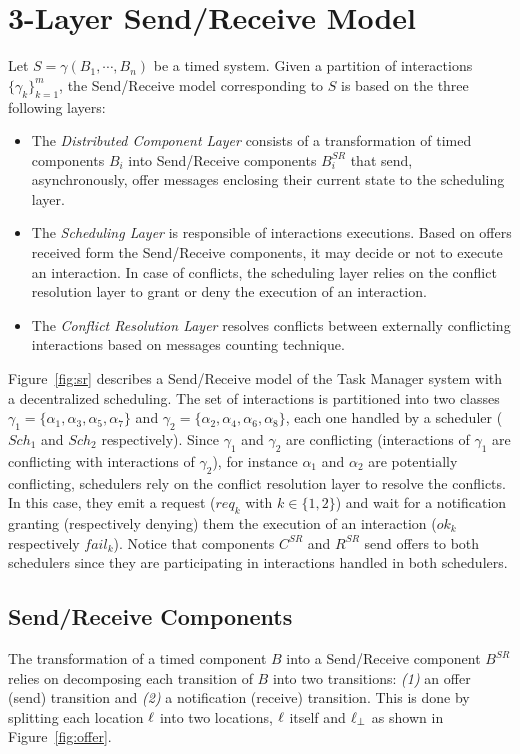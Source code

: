 \section{3-Layer Send/Receive Model}\label{sec:3.2}
Let $S=\gamma(B_1,\cdots,B_n)$ be a timed system. Given a partition of interactions
$\{\gamma_k\}^m_{k=1}$, the Send/Receive model corresponding to $S$ is based on the three
following layers:
\begin{itemize}
  \item The \emph{Distributed Component Layer} consists of a transformation of timed components
    $B_i$ into Send/Receive components $B_i^{SR}$ that send, asynchronously, offer messages 
    enclosing their current state to the scheduling layer. 
  \item The \emph{Scheduling Layer} is responsible of interactions executions. Based on offers 
    received form the Send/Receive components, it may decide or not to execute an interaction.
    In case of conflicts, the scheduling layer relies on the conflict resolution layer to grant
    or deny the execution of an interaction.
  \item The \emph{Conflict Resolution Layer} resolves conflicts between externally conflicting 
    interactions based on messages counting technique.
\end{itemize}


\begin{example}
  Figure~\ref{fig:sr} describes a Send/Receive model of the Task Manager system with a 
  decentralized scheduling. 
  The set of interactions is partitioned into two classes 
  $\gamma_1=\{\alpha_1,\alpha_3,\alpha_5,\alpha_7\}$ and
  $\gamma_2=\{\alpha_2,\alpha_4,\alpha_6,\alpha_8\}$, each one handled by a scheduler ($Sch_1$
  and $Sch_2$ respectively). Since $\gamma_1$ and $\gamma_2$ are conflicting (interactions of 
  $\gamma_1$ are conflicting with interactions of $\gamma_2$), for instance
  $\alpha_1$ and $\alpha_2$ are potentially conflicting, schedulers rely on the conflict
  resolution layer to resolve the conflicts. In this case, they emit a request ($req_k$ with
  $k\in\{1,2\}$) and wait for a notification granting (respectively denying) them the execution
  of an interaction ($ok_k$ respectively $fail_k$).
  Notice that components $C^{SR}$ and $R^{SR}$ send offers to both schedulers since
  they are participating in interactions handled in both schedulers.
\end{example}
\subsection{Send/Receive Components}

The transformation of a timed component $B$ into a Send/Receive component $B^{SR}$ relies 
on decomposing each transition of $B$ into two transitions: \emph{(1)} an offer (send)
transition and \emph{(2)} a notification (receive) transition. This is done by splitting
each location $\ell$ into two locations, $\ell$ itself and $\ell_{\perp}$ as shown in 
Figure~\ref{fig:offer}.

